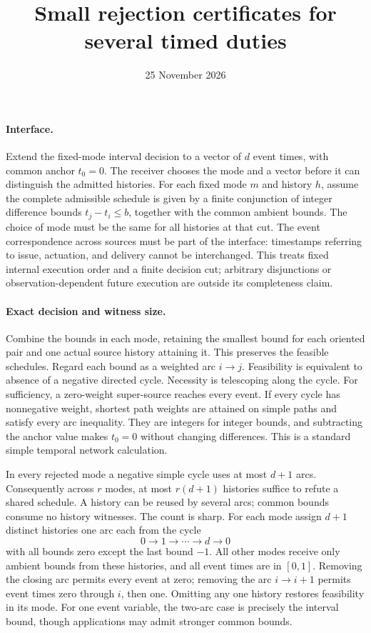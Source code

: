 \documentclass[11pt]{article}
\title{Small rejection certificates for several timed duties}
\date{25 November 2026}
\begin{document}
\maketitle

\paragraph{Interface.}
Extend the fixed-mode interval decision to a vector of \(d\) event
times, with common anchor \(t_0=0\). The receiver chooses the mode
and a vector before it can distinguish the admitted histories.
For each fixed mode \(m\) and history \(h\), assume the complete
admissible schedule is given by a finite conjunction of integer
difference bounds \(t_j-t_i\leq b\), together with the common
ambient bounds. The choice of mode must be the same for all
histories at that cut. The event correspondence across sources
must be part of the interface: timestamps referring to issue,
actuation, and delivery cannot be interchanged. This treats fixed
internal execution order and a finite decision cut; arbitrary
disjunctions or observation-dependent future execution are outside
its completeness claim.

\paragraph{Exact decision and witness size.}
Combine the bounds in each mode, retaining the smallest bound
for each oriented pair and one actual source history attaining it.
This preserves the feasible schedules. Regard each bound as a
weighted arc \(i\to j\). Feasibility is equivalent to absence of a
negative directed cycle. Necessity is telescoping along the cycle.
For sufficiency, a zero-weight super-source reaches every event.
If every cycle has nonnegative weight, shortest path weights are
attained on simple paths and satisfy every arc inequality.
They are integers for integer bounds, and subtracting the anchor
value makes \(t_0=0\) without changing differences.
This is a standard simple temporal network calculation.

In every rejected mode a negative simple cycle uses at most \(d+1\)
arcs. Consequently across \(r\) modes, at most \(r(d+1)\)
histories suffice to refute a shared schedule. A history can be
reused by several arcs; common bounds consume no history witnesses.
The count is sharp. For each mode assign \(d+1\) distinct histories
one arc each from the cycle
\[
  0\to1\to\cdots\to d\to0
\]
with all bounds zero except the last bound \(-1\).
All other modes receive only ambient bounds from these histories,
and all event times are in \([0,1]\).
Removing the closing arc permits every event at zero; removing the
arc \(i\to i+1\) permits event times zero through \(i\), then one.
Omitting any one history restores feasibility in its mode. For
one event variable, the two-arc case is precisely the interval
bound, though applications may admit stronger common bounds.
\end{document}
